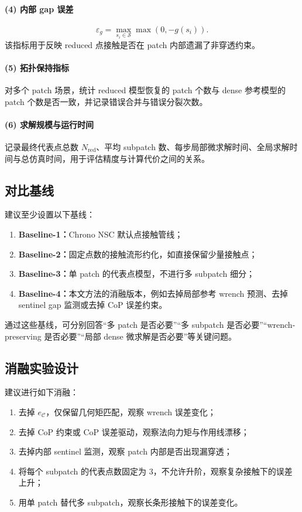 \documentclass[UTF8,a4paper,11pt]{ctexart}
\begin{document}
\paragraph{(4) 内部 gap 误差}
\begin{equation}
\varepsilon_g = \max_{s_i\in\mathcal{S}} \max(0,-g(s_i)).
\end{equation}
该指标用于反映 reduced 点接触是否在 patch 内部遗漏了非穿透约束。

\paragraph{(5) 拓扑保持指标}
对多个 patch 场景，统计 reduced 模型恢复的 patch 个数与 dense 参考模型的 patch 个数是否一致，并记录错误合并与错误分裂次数。

\paragraph{(6) 求解规模与运行时间}
记录最终代表点总数 $N_{\mathrm{red}}$、平均 subpatch 数、每步局部微求解时间、全局求解时间与总仿真时间，用于评估精度与计算代价之间的关系。

\subsection{对比基线}

建议至少设置以下基线：
\begin{enumerate}[label=(\arabic*)]
    \item \textbf{Baseline-1：}Chrono NSC 默认点接触管线；
    \item \textbf{Baseline-2：}固定点数的接触流形约化，如直接保留少量接触点；
    \item \textbf{Baseline-3：}单 patch 的代表点模型，不进行多 subpatch 细分；
    \item \textbf{Baseline-4：}本文方法的消融版本，例如去掉局部参考 wrench 预测、去掉 sentinel gap 监测或去掉 CoP 误差约束。
\end{enumerate}

通过这些基线，可分别回答“多 patch 是否必要”“多 subpatch 是否必要”“wrench-preserving 是否必要”“局部 dense 微求解是否必要”等关键问题。

\subsection{消融实验设计}

建议进行如下消融：
\begin{enumerate}[label=(\alph*)]
    \item 去掉 $e_{\mathcal{C}}$，仅保留几何矩匹配，观察 wrench 误差变化；
    \item 去掉 CoP 约束或 CoP 误差驱动，观察法向力矩与作用线漂移；
    \item 去掉内部 sentinel 监测，观察 patch 内部是否出现漏穿透；
    \item 将每个 subpatch 的代表点数固定为 3，不允许升阶，观察复杂接触下的误差上升；
    \item 用单 patch 替代多 subpatch，观察长条形接触下的误差变化。
\end{enumerate}
\end{document}

